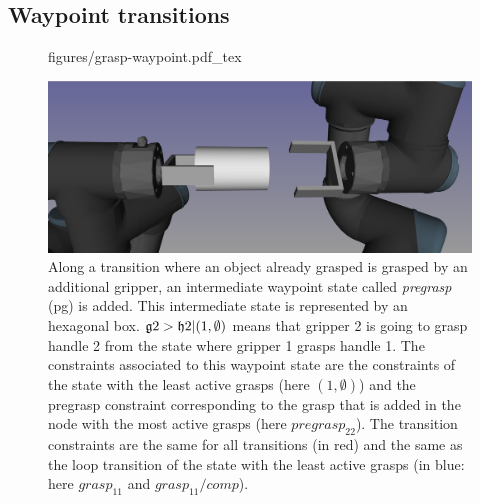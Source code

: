 \subsection{Waypoint transitions}\label{subsec:waypoint}

\begin{figure}
  \begin{center}
    \def\svgwidth {\linewidth}
    {
      \graphicspath{{./figures/}}
       {figures/grasp-waypoint.pdf_tex}
    }
    \includegraphics[width=.8\linewidth]{figures/dual-grasp-pregrasp.png}
  \end{center}
  \caption{Along a transition where an object already grasped is grasped by
    an additional gripper, an intermediate waypoint state called
    \textit{pregrasp} (pg) is added. This intermediate state is represented by
    an hexagonal box. $\mathfrak{g}{2} > \mathfrak{h}{2}|(1,\emptyset)$ means that
    gripper 2 is going to grasp handle 2 from the state where gripper 1 grasps
    handle 1. The constraints associated to this waypoint state are the
    constraints of the state with the least active grasps (here $(1,\emptyset)$)
    and the pregrasp constraint corresponding to the grasp that is added in
    the node with the most active grasps (here $pregrasp_{22}$). The transition
    constraints are the same for all transitions (in red) and the same as
    the loop transition of the state with the least active grasps (in blue: here
    $grasp_{11}$ and $grasp_{11}/comp$).}
  \label{fig:pregrasp-grasp}
\end{figure}
